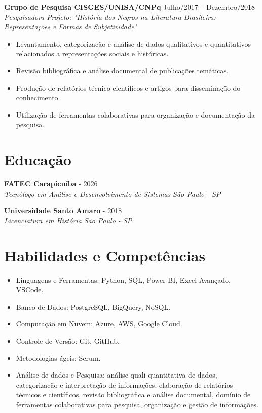 \documentclass[a4paper,10pt]{article}
\newcommand{\entry}[4]{
  \noindent\textbf{#1} \hfill #2 \\
  \noindent\textit{#3} \hfill \textit{#4} \\
  \vspace{2pt}
}
\begin{document}
\begin{center}
\begin{itemize}
\end{itemize}

\entry{Grupo de Pesquisa CISGES/UNISA/CNPq}{\faCalendar \space 
 Julho/2017 -- Dezembro/2018}{Pesquisadora}{Projeto: "História dos Negros na Literatura Brasileira: Representações e Formas de Subjetividade"}
\space
\vspace{-1.6em}
\begin{itemize}
\setlength\itemsep{0em}
\item Levantamento, categorizacão e análise de dados qualitativos e quantitativos relacionados a representações sociais e históricas.
\item Revisão bibliográfica e análise documental de publicações temáticas.
\item Produção de relatórios técnico-científicos e artigos para disseminação do conhecimento.
\item Utilização de ferramentas colaborativas para organização e documentação da pesquisa.

\end{itemize}




\section*{Educação}
\vspace{0.6em}

\entry{FATEC Carapicuíba}{\faCalendar {} - 2026}{Tecnólogo em Análise e Desenvolvimento de Sistemas}{\faMapMarker \space São Paulo - SP}

\entry{Universidade Santo Amaro}{\faCalendar {} - 2018}{Licenciatura em História}{\faMapMarker \space São Paulo - SP}


\section*{Habilidades e Competências}
\vspace{0.6em}
\begin{itemize}
\setlength\itemsep{0em}
\item Linguagens e Ferramentas: Python, SQL, Power BI, Excel Avançado, VSCode.
\item Banco de Dados: PostgreSQL, BigQuery, NoSQL.
\item Computação em Nuvem: Azure, AWS, Google Cloud.
\item Controle de Versão: Git, GitHub.
\item Metodologias ágeis: Scrum.
\item Análise de dados e Pesquisa: análise quali-quantitativa de dados, categorizacão e interpretação de informações, elaboração de relatórios técnicos e científicos, revisão bibliográfica e análise documental, domínio de ferramentas colaborativas para pesquisa, organização e gestão de informações.


\end{itemize}
\end{center}
\end{document}
